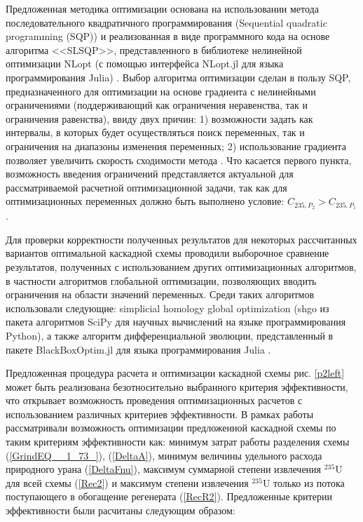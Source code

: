 Предложенная методика оптимизации основана на использовании метода последовательного квадратичного программирования (Sequential quadratic programming (SQP)) и реализованная в виде программного кода на основе алгоритма <<SLSQP>>, представленного в библиотеке нелинейной оптимизации NLopt (с помощью интерфейса NLopt.jl для языка программирования Julia) \cite{NLopt}. Выбор алгоритма оптимизации сделан в пользу SQP, предназначенного для оптимизации на основе градиента с нелинейными ограничениями (поддерживающий как ограничения неравенства, так и ограничения равенства), ввиду двух причин: 1) возможности задать как интервалы, в которых будет осуществляться поиск переменных, так и ограничения на диапазоны изменения переменных; 2) использование градиента позволяет увеличить скорость сходимости метода \cite{NumericalOptimization2006}. Что касается первого пункта, возможность введения ограничений представляется актуальной для рассматриваемой расчетной оптимизационной задачи, так как для оптимизационных переменных должно быть выполнено условие: ${C_{235,{P_2}}}>{C_{235,{P_1}}}$. 

Для проверки корректности полученных результатов для некоторых рассчитанных вариантов оптимальной каскадной схемы проводили выборочное сравнение результатов, полученных с использованием других оптимизационных алгоритмов, в частности алгоритмов глобальной оптимизации, позволяющих вводить ограничения на области значений переменных. Среди таких алгоритмов использовали следующие: simplicial homology global optimization (shgo из пакета алгоритмов SciPy для научных вычислений на языке программирования Python), а также алгоритм дифференциальной эволюции, представленный в пакете BlackBoxOptim.jl для языка программирования Julia \cite{пантелеевМетаэвристическиеАлгоритмыПоиска2009,virtanenSciPyFundamentalAlgorithms2020,endresSimplicialHomologyAlgorithm2018,mogensenOptimMathematicalOptimization2018,storn1997differential,Price-et-al-differential-evolution-2005,Feldt2018}.

Предложенная процедура расчета и оптимизации каскадной схемы рис. \ref{p2left} может быть реализована безотносительно выбранного критерия эффективности, что открывает возможность проведения оптимизационных расчетов с использованием различных критериев эффективности. В рамках работы рассматривали возможность оптимизации предложенной каскадной схемы по таким критериям эффективности как: минимум затрат работы разделения схемы (\ref{GrindEQ__1_73_}), (\ref{DeltaA}), минимум величины удельного расхода природного урана (\ref{DeltaFnu}), максимум суммарной степени извлечения $^{235}$U для всей схемы (\ref{Rec2}) и максимум степени извлечения $^{235}$U только из потока поступающего в обогащение регенерата (\ref{RecR2}). Предложенные критерии эффективности были расчитаны следующим образом:

